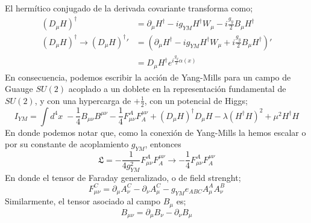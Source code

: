 \documentclass[../main.tex]{subfiles}
\begin{document}
 El hermítico conjugado de la derivada covariante transforma como; 
 \begin{align*}
   \left( D_\mu H \right)^\dagger & = \partial_\mu H^\dagger - ig_{YM} H^\dagger W_\mu - i\frac{g_y}{2}B_\mu H^\dagger \\
   \left( D_\mu H  \right)^\dagger \rightarrow \left( D_\mu H \right)^\dagger '& = \left( \partial_\mu H^\dagger - ig_{YM}H^\dagger W_\mu + i\frac{g_y}{2}B_\mu H^\dagger \right)' \\
   & = D_\mu  H^\dagger e^{i\frac{g_y}{2}\alpha(x)}
 \end{align*}
En consecuencia, podemos escribir la acción de Yang-Mills para un campo de Guauge $SU(2)$ acoplado a un doblete en la representación fundamental de $SU(2)$, y con una hypercarga de $+\frac{1}{2}$, con un potencial de Higgs;
\begin{equation}
  I_{YM} = \int d^4x \; -\frac{1}{4}B_{\mu\nu} B^{\mu\nu} - \frac{1}{4}F_{\mu\nu}^A F^{\mu\nu}_A + \left( D_\mu H \right)^\dagger D_\mu H - \lambda \left( H^\dagger H \right)^2 + \mu^2 H^\dagger H
 \end{equation}
 En donde podemos notar que, como la conexión de Yang-Mills la hemos escalar o por su constante de acoplamiento $g_{YM}$, entonces
 \begin{equation}
   \mathfrak{L} = -\frac{1}{4g_{YM}^2} F^A_{\mu\nu}F_A^{\mu\nu} \rightarrow -\frac{1}{4}F_{\mu\nu}^A F_A^{\mu\nu}
  \end{equation}
  En donde el tensor de Faraday generalizado, o de field strenght;
  \begin{equation}
    F^C_{\mu\nu} = \partial_\mu A^C_\nu - \partial_\nu A^C_\mu - g_{YM} e_{ABC} A^A_\mu A^B_\nu
   \end{equation}
  Similarmente, el tensor asociado al campo $B_\mu$ es;
  \begin{equation}
    B_{\mu\nu} = \partial_\mu B_\nu - \partial_\nu B_\mu
   \end{equation}
\end{document}
